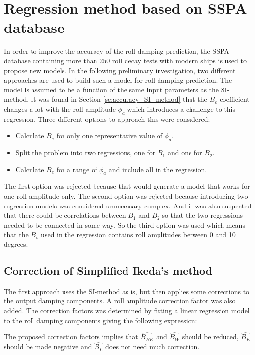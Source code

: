 \section{Regression method based on SSPA database}
\label{se:correction_SI_method}
In order to improve the accuracy of the roll damping prediction, the SSPA database containing more than 250 roll decay tests with modern ships is used to propose new models. In the following preliminary investigation, two different approaches are used to build such a model for roll damping prediction. The model is assumed to be a function of the same input parameters as the SI-method. It was found in Section \ref{se:accuracy_SI_method} that the $B_e$ coefficient changes a lot with the roll amplitude $\phi_a$ which introduces a challenge to this regression. Three different options to approach this were considered:
\begin{itemize}
    \item Calculate $B_e$ for only one representative value of $\phi_a$.
    \item Split the problem into two regressions, one for $B_1$ and one for $B_2$.
    \item Calculate $B_e$ for a range of $\phi_a$ and include all in the regression.
\end{itemize}
The first option was rejected because that would generate a model that works for one roll amplitude only. The second option was rejected because introducing two regression models was considered unnecessary complex. And it was also suspected that there could be correlations between $B_1$ and $B_2$ so that the two regressions needed to be connected in some way. So the third option was used which means that the $B_e$ used in the regression contains roll amplitudes between 0 and 10 degrees.  

\subsection{Correction of Simplified Ikeda's method}
The first approach uses the SI-method as is, but then applies some corrections to the output damping components. A roll amplitude correction factor was also added. The correction factors was determined by fitting a linear regression model to the roll damping components giving the following expression: 

The proposed correction factors implies that $\hat{B_{BK}}$ and $\hat{B_{W}}$ should be reduced, $\hat{B_{E}}$ should be made negative and $\hat{B_{L}}$ does not need much correction.


